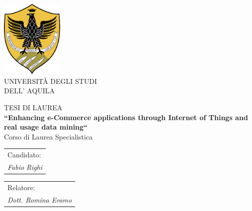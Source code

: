 


\thispagestyle{empty}
\begin{center}

        \includegraphics[width=3cm]{images/logo}\\
\vspace{1cm}
       {\Huge UNIVERSIT\`A DEGLI STUDI}\\
        \vspace{8mm}                                                  %
        {\Huge DELL' AQUILA}\\
        \vspace{1.3cm}
        \vspace{2.2cm}

         {\Large TESI DI LAUREA} \\

        \vspace{8mm}
        {\LARGE \bfseries ``Enhancing e-Commerce applications through Internet of Things and real usage data mining``} \\
        \vspace{2.8cm}
        {\large Corso di Laurea Specialistica}\\
        \vspace{18mm}
    \end{center}
\vspace{20mm}
   \begin{tabular}{l}
        { Candidato:}\\
        { \textit{Fabio Righi}}\\
      \end{tabular}
    \hfill
    \begin{tabular}{l}
        { Relatore:}\\
        { \textit{Dott.  Romina Eramo}}\\
    \end{tabular}
\vspace{20mm}

